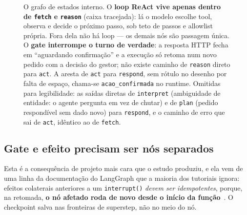 \documentclass[10pt,twocolumn]{article}
\newcommand{\code}[1]{\texttt{\footnotesize #1}}
\begin{document}
\begin{figure}[t]
{}
\caption{O grafo de estados interno. O \textbf{loop ReAct vive apenas dentro de
\code{fetch} e \code{reason}} (caixa tracejada): lá o modelo escolhe tool, observa e decide o
próximo passo, sob teto de passos e allowlist própria. Fora dela não há loop --- os demais
nós são passagem única. O \textbf{gate interrompe o turno de verdade}: a resposta HTTP fecha
em ``aguardando confirmação'' e a execução só retoma num novo pedido com a decisão do
gestor; não existe caminho de \code{reason} direto para \code{act}. A aresta de \code{act}
para \code{respond}, sem rótulo no desenho por falta de espaço, chama-se
\code{acao\_confirmada} no runtime. Omitidas para
legibilidade: as saídas diretas de \code{interpret} (ambiguidade de entidade: o agente
pergunta em vez de chutar) e de \code{plan} (pedido respondível sem dado novo) para
\code{respond}, e o caminho de erro que sai de \code{act}, idêntico ao de \code{fetch}.}
\label{fig:grafo}
\end{figure}

\subsection{Gate e efeito precisam ser nós separados}

Esta é a consequência de projeto mais cara que o estudo produziu, e ela vem de uma linha da
documentação do LangGraph que a maioria dos tutoriais ignora: efeitos colaterais anteriores
a um \code{interrupt()} \emph{devem ser idempotentes}, porque, na retomada, \textbf{o nó
afetado roda de novo desde o início da função}~\cite{langchain2026langgraph}. O checkpoint
salva nas fronteiras de superstep, não no meio do nó.
\end{document}
